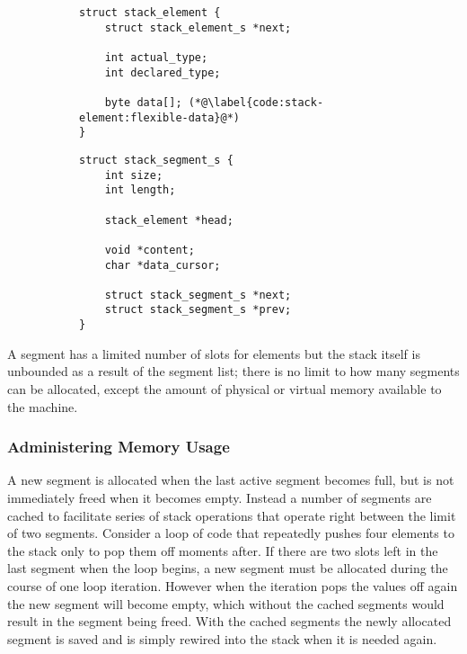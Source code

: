\begin{figure}[h]
  \centering
  \begin{subfigure}[a]{.49\textwidth}
    \begin{lstlisting}[language={[ANSI]C},%
  caption={Structure defining the stack},%
  label={lst:implementation:stack:element}]
struct stack_element {
    struct stack_element_s *next;

    int actual_type;
    int declared_type;

    byte data[]; (*@\label{code:stack-element:flexible-data}@*)
}
    \end{lstlisting}
  \end{subfigure}
  \begin{subfigure}[a]{.49\textwidth}
    \begin{lstlisting}[language={[ANSI]C},%
  caption={Structure defining a segment of the stack},%
  label={lst:implementation:stack:segment}]
struct stack_segment_s {
    int size;
    int length;

    stack_element *head;

    void *content;
    char *data_cursor;

    struct stack_segment_s *next;
    struct stack_segment_s *prev;
}
    \end{lstlisting}
  \end{subfigure}
\end{figure}

A segment has a limited number of slots for elements but the stack itself is
unbounded as a result of the segment list; there is no limit to how many
segments can be allocated, except the amount of physical or virtual memory
available to the machine.

\subsubsection{Administering Memory Usage}

A new segment is allocated when the last active segment becomes full, but is not
immediately freed when it becomes empty. Instead a number of segments are cached
to facilitate series of stack operations that operate right between the limit of
two segments. Consider a loop of code that repeatedly pushes four elements to
the stack only to pop them off moments after. If there are two slots left in the
last segment when the loop begins, a new segment must be allocated during the
course of one loop iteration. However when the iteration pops the values off
again the new segment will become empty, which without the cached segments would
result in the segment being freed. With the cached segments the newly allocated
segment is saved and is simply rewired into the stack when it is needed again.

